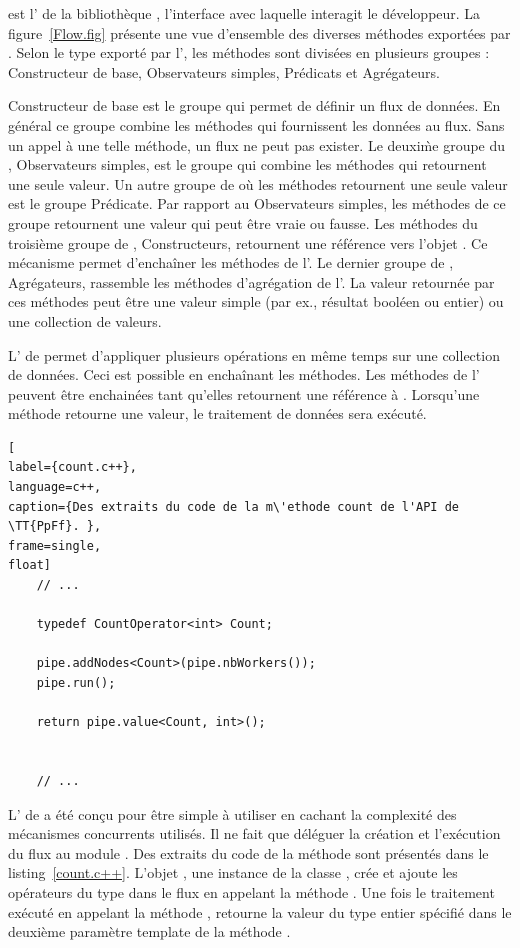  est l' de la biblioth\`eque , l'interface avec laquelle interagit le d\'eveloppeur. La figure~\ref{Flow.fig} pr\'esente une vue d'ensemble des diverses m\'ethodes export\'ees par . Selon le type export\'e par l', les m\'ethodes sont divis\'ees en plusieurs groupes : Constructeur de base, Observateurs simples, Pr\'edicats et Agr\'egateurs.

Constructeur de base est le groupe qui permet de d\'efinir un flux de donn\'ees. En g\'en\'eral ce groupe combine les m\'ethodes qui fournissent les donn\'ees au flux. Sans un appel \`a une telle m\'ethode, un flux ne peut pas exister. Le deuxi\`me groupe du , Observateurs simples, est le groupe qui combine les m\'ethodes qui retournent une seule valeur. Un autre groupe de  o\`u les m\'ethodes retournent une seule valeur est le groupe Pr\'edicate. Par rapport au Observateurs simples, les m\'ethodes de ce groupe retournent une valeur qui peut \^etre vraie ou fausse. Les m\'ethodes du troisi\`eme groupe de , Constructeurs, retournent une r\'ef\'erence vers l'objet . Ce m\'ecanisme permet d'encha\^iner les m\'ethodes de l'. Le dernier groupe de , Agr\'egateurs, rassemble les m\'ethodes d'agr\'egation de l'. La valeur retourn\'ee par ces m\'ethodes peut \^etre une valeur simple (par ex., r\'esultat bool\'een ou entier) ou une collection de valeurs.

L' de  permet d'appliquer plusieurs op\'erations en m\^eme temps sur une collection de donn\'ees. Ceci est possible en encha\^inant les m\'ethodes. Les m\'ethodes de l' peuvent \^etre enchain\'ees tant qu'elles retournent une r\'ef\'erence \`a . Lorsqu'une m\'ethode retourne une valeur, le traitement de donn\'ees sera ex\'ecut\'e. 


\begin{lstlisting}[
label={count.c++},
language=c++,
caption={Des extraits du code de la m\'ethode count de l'API de \TT{PpFf}. },
frame=single,
float]
    // ...

	typedef CountOperator<int> Count;
            
	pipe.addNodes<Count>(pipe.nbWorkers());
	pipe.run();

	return pipe.value<Count, int>();


    // ...
\end{lstlisting}

L' de  a \'et\'e con\c {c}u pour \^etre simple \`a utiliser en cachant la complexit\'e des m\'ecanismes concurrents utilis\'es. Il ne fait que d\'el\'eguer la cr\'eation et l'ex\'ecution du flux au module . Des extraits du code de la m\'ethode  sont pr\'esent\'es dans le listing~\ref{count.c++}. L'objet , une instance de la classe , cr\'ee et ajoute les op\'erateurs du type  dans le flux en appelant la m\'ethode . Une fois le traitement ex\'ecut\'e en appelant la m\'ethode ,  retourne la valeur du type entier sp\'ecifi\'e dans le deuxi\`eme param\`etre template de la m\'ethode .

